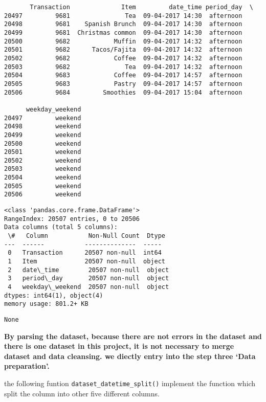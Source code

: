 \documentclass[11pt]{article}
\begin{document}
    \begin{verbatim}
       Transaction              Item         date_time period_day  \
20497         9681               Tea  09-04-2017 14:30  afternoon   
20498         9681    Spanish Brunch  09-04-2017 14:30  afternoon   
20499         9681  Christmas common  09-04-2017 14:30  afternoon   
20500         9682            Muffin  09-04-2017 14:32  afternoon   
20501         9682      Tacos/Fajita  09-04-2017 14:32  afternoon   
20502         9682            Coffee  09-04-2017 14:32  afternoon   
20503         9682               Tea  09-04-2017 14:32  afternoon   
20504         9683            Coffee  09-04-2017 14:57  afternoon   
20505         9683            Pastry  09-04-2017 14:57  afternoon   
20506         9684         Smoothies  09-04-2017 15:04  afternoon   

      weekday_weekend  
20497         weekend  
20498         weekend  
20499         weekend  
20500         weekend  
20501         weekend  
20502         weekend  
20503         weekend  
20504         weekend  
20505         weekend  
20506         weekend  
    \end{verbatim}

    
    \begin{Verbatim}[commandchars=\\\{\}]
<class 'pandas.core.frame.DataFrame'>
RangeIndex: 20507 entries, 0 to 20506
Data columns (total 5 columns):
 \#   Column           Non-Null Count  Dtype
---  ------           --------------  -----
 0   Transaction      20507 non-null  int64
 1   Item             20507 non-null  object
 2   date\_time        20507 non-null  object
 3   period\_day       20507 non-null  object
 4   weekday\_weekend  20507 non-null  object
dtypes: int64(1), object(4)
memory usage: 801.2+ KB
    \end{Verbatim}

    
    \begin{verbatim}
None
    \end{verbatim}

    
    \textbf{By parsing the dataset, because there are not errors in the
dataset and there is one dataset in this project, it is not necessary to
merge dataset and data cleansing. we diectly entry into the step three
`Data preparation'.}

the following funtion \texttt{dataset\_datetime\_split()} implement the
function which split the column into other five different columns.
\end{document}
